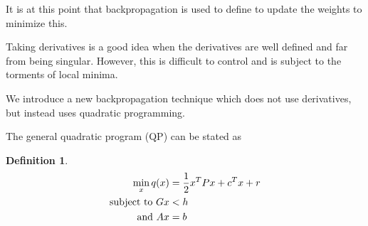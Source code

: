 \documentclass[11pt]{amsart}
\newtheorem{theorem}{Theorem}[section]
\newtheorem{corollary}{Corollary}[theorem]
\newtheorem{lemma}[theorem]{Lemma}
\theoremstyle{definition}
\newtheorem{definition}{Definition}[section]
\begin{document}
It is at this point that backpropagation is used to define to update the weights to minimize this. 

Taking derivatives is a good idea when the derivatives are well defined and far from being singular. However, this is difficult to control and is subject to the torments of local minima.


We introduce a new backpropagation technique which does not use derivatives, but instead uses quadratic programming. 

The general quadratic program (QP) can be stated as 
\begin{definition}
\begin{align*}
\min_x q(x)  & =  \frac{1}{2} x^T P x + c^Tx + r\\
\hbox{subject to } Gx & < h \\
\hbox{and } Ax & = b
\end{align*}
\end{definition}

%
%
%
%
%




\end{document}
